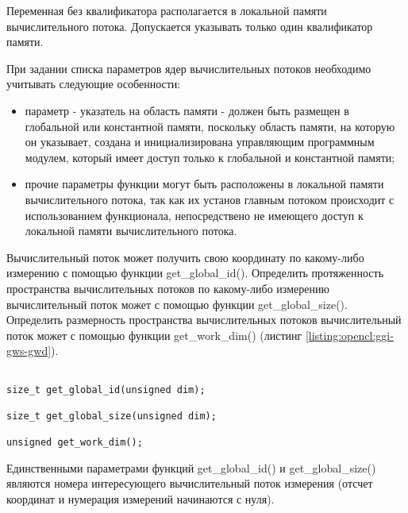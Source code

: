 		Переменная без квалификатора располагается в локальной памяти вычислительного потока. Допускается указывать только один квалификатор памяти.

		При задании списка параметров ядер вычислительных потоков необходимо учитывать следующие особенности:

		\begin{itemize}

			\item параметр - указатель на область памяти - должен быть размещен в глобальной или константной памяти, поскольку область памяти, на которую он указывает, создана и инициализирована управляющим программным модулем, который имеет доступ только к глобальной и константной памяти;

			\item прочие параметры функции могут быть расположены в локальной памяти вычислительного потока, так как их установ главным потоком происходит с использованием функционала, непосредствено не имеющего доступ к локальной памяти вычислительного потока.

		\end{itemize}


		Вычислительный поток может получить свою координату по какому-либо измерению с помощью функции get\_global\_id(). Определить протяженность пространства вычислительных потоков по какому-либо измерению вычислительный поток может с помощью функции get\_global\_size(). Определить размерность пространства вычислительных потоков вычислительный поток может с помощью функции get\_work\_dim() (листинг \ref{listing:opencl:ggi-gws-gwd}).

\begin{lstlisting}

size_t get_global_id(unsigned dim);

size_t get_global_size(unsigned dim);

unsigned get_work_dim();

\end{lstlisting}
\mylistingend

		Единственными параметрами функций get\_global\_id() и get\_\linebreak global\_size() являются номера интересующего вычислительный поток измерения (отсчет координат и нумерация измерений начинаются с нуля).

